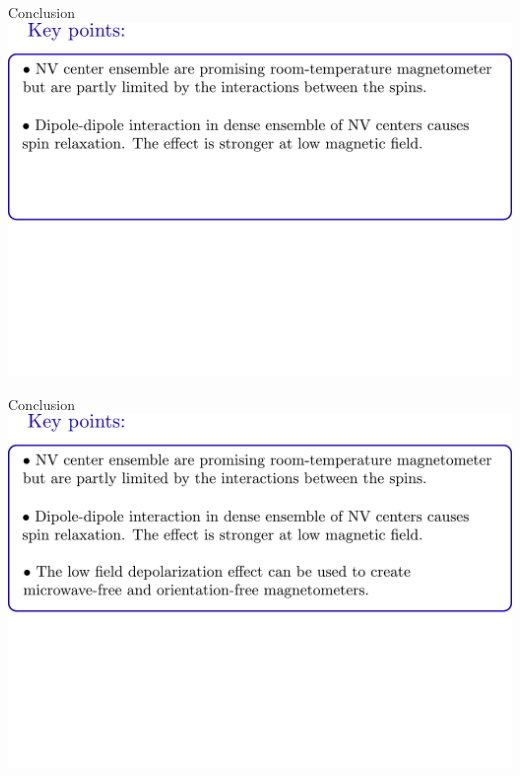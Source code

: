 \documentclass{beamer}
\begin{document}
\begin{frame}{Conclusion}
\centering
\includegraphics[width=\textwidth,height=0.85\textheight,keepaspectratio]{Slide_CCL_f-3}
\end{frame}

\begin{frame}{Conclusion}
\centering
\includegraphics[width=\textwidth,height=0.85\textheight,keepaspectratio]{Slide_CCL_f-2}
\end{frame}
\end{document}
